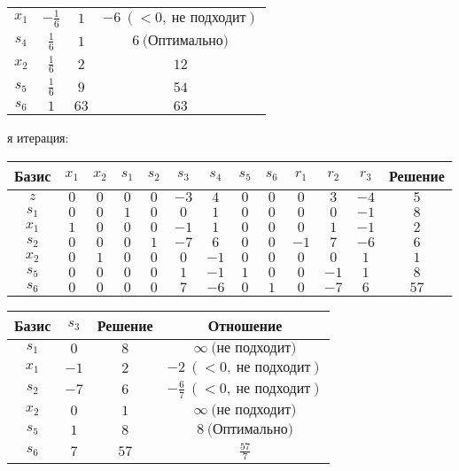 \documentclass{article}%
\begin{document}
\begin{flushleft}
\begin{tabular}{|cccc|}
$x_{1}$&$-\frac{1}{6}$&$1$&$-6\: (< 0, \: \text{не подходит})$\\%
$s_{4}$&$\frac{1}{6}$&$1$&$6\: \text{(Оптимально)}$\\%
$x_{2}$&$\frac{1}{6}$&$2$&$12$\\%
$s_{5}$&$\frac{1}{6}$&$9$&$54$\\%
$s_{6}$&$1$&$63$&$63$\\%
\hline%
\end{tabular}%
\newline%
\newline%
я итерация: %
\newline%
\newline%
\renewcommand{\arraystretch}{1.3}%
\begin{tabular}{|c|ccccccccccc|c|}%
\hline%
Базис&$x_{1}$&$x_{2}$&$s_{1}$&$s_{2}$&$s_{3}$&$s_{4}$&$s_{5}$&$s_{6}$&$r_{1}$&$r_{2}$&$r_{3}$&Решение\\%
\hline%
$z$&$0$&$0$&$0$&$0$&$-3$&$4$&$0$&$0$&$0$&$3$&$-4$&$5$\\%
\hline%
$s_{1}$&$0$&$0$&$1$&$0$&$0$&$1$&$0$&$0$&$0$&$0$&$-1$&$8$\\%
$x_{1}$&$1$&$0$&$0$&$0$&$-1$&$1$&$0$&$0$&$0$&$1$&$-1$&$2$\\%
$s_{2}$&$0$&$0$&$0$&$1$&$-7$&$6$&$0$&$0$&$-1$&$7$&$-6$&$6$\\%
$x_{2}$&$0$&$1$&$0$&$0$&$0$&$-1$&$0$&$0$&$0$&$0$&$1$&$1$\\%
$s_{5}$&$0$&$0$&$0$&$0$&$1$&$-1$&$1$&$0$&$0$&$-1$&$1$&$8$\\%
$s_{6}$&$0$&$0$&$0$&$0$&$7$&$-6$&$0$&$1$&$0$&$-7$&$6$&$57$\\%
\hline%
\end{tabular}%
\newline%
\newline%
\newline%
\begin{tabular}{|cccc|}%
\hline%
Базис&$s_{3}$&Решение&Отношение\\%
\hline%
$s_{1}$&$0$&$8$&$\infty \: \text{(не подходит)}$\\%
$x_{1}$&$-1$&$2$&$-2\: (< 0, \: \text{не подходит})$\\%
$s_{2}$&$-7$&$6$&$-\frac{6}{7}\: (< 0, \: \text{не подходит})$\\%
$x_{2}$&$0$&$1$&$\infty \: \text{(не подходит)}$\\%
$s_{5}$&$1$&$8$&$8\: \text{(Оптимально)}$\\%
$s_{6}$&$7$&$57$&$\frac{57}{7}$\\%

\end{tabular}
\end{flushleft}
\end{document}

